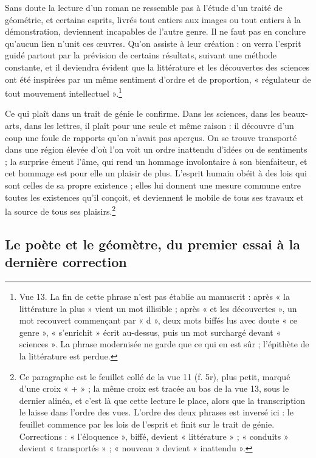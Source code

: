 \documentclass[11pt,a4paper]{article}
\begin{document}
Sans doute la lecture d'un roman ne ressemble pas à l'étude d'un traité de
géométrie, et certains esprits, livrés tout entiers aux images ou tout entiers à
la démonstration, deviennent incapables de l'autre genre. Il ne faut pas en
conclure qu'aucun lien n'unit ces œuvres. Qu'on assiste à leur création : on
verra l'esprit guidé partout par la prévision de certains résultats, suivant
une méthode constante, et il deviendra évident que la littérature et les
découvertes des sciences ont été inspirées par un même sentiment d'ordre et de
proportion, « régulateur de tout mouvement intellectuel ».\footnote{Vue 13. La
fin de cette phrase n'est pas établie au manuscrit : après « la littérature la plus »
vient un mot illisible ; après « et les découvertes », un mot recouvert
commençant par « d », deux mots biffés lus avec doute « ce genre »,
« s'enrichit » écrit au-dessus, puis un mot surchargé devant « sciences ». La phrase
modernisée ne garde que ce qui en est sûr ; l'épithète de la littérature est
perdue.}

Ce qui plaît dans un trait de génie le confirme. Dans les sciences, dans les
beaux-arts, dans les lettres, il plaît pour une seule et même raison : il
découvre d'un coup une foule de rapports qu'on n'avait pas aperçus. On se
trouve transporté dans une région élevée d'où l'on voit un ordre inattendu
d'idées ou de sentiments ; la surprise émeut l'âme, qui rend un hommage
involontaire à son bienfaiteur, et cet hommage est pour elle un plaisir de plus.
L'esprit humain obéit à des lois qui sont celles de sa propre existence ; elles
lui donnent une mesure commune entre toutes les existences qu'il conçoit, et
deviennent le mobile de tous ses travaux et la source de tous ses
plaisirs.\footnote{Ce paragraphe est le feuillet collé de la vue 11 (f. 5r),
plus petit, marqué d'une croix « + » ; la même croix est tracée au bas de la
vue 13, sous le dernier alinéa, et c'est là que cette lecture le place, alors
que la transcription le laisse dans l'ordre des vues. L'ordre des deux phrases
est inversé ici : le feuillet commence par les lois de l'esprit et finit sur le
trait de génie. Corrections : « l'éloquence », biffé, devient « littérature » ;
« conduits » devient « transportés » ; « nouveau » devient « inattendu ».}

\subsection*{Le poète et le géomètre, du premier essai à la dernière correction}
\end{document}
